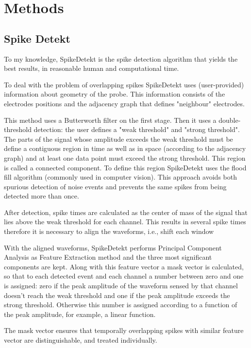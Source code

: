 
\section{Methods}
\label{sec:methods}
\subsection{Spike Detekt}
\label{subsec:spikedetekt}

To my knowledge, SpikeDetekt \cite{Rossant2016} is the spike detection algorithm that yields the best results, in reasonable human and computational time. 

To deal with the problem of overlapping spikes SpikeDetekt uses (user-provided) information about geometry of the probe. This information consists of the electrodes positions and the adjacency graph that defines "neighbour" electrodes. 

This method uses a Butterworth filter on the first stage. Then it uses a double-threshold detection: the user defines a "weak threshold" and "strong threshold". The parts of the signal whose amplitude exceeds the weak threshold must be define a contiguous region in time as well as in space (according to the adjacency graph) and at least one data point must exceed the strong threshold. This region is called a connected component. To define this region SpikeDetekt uses the flood fill algorithm (commonly used in computer vision). This approach avoids both spurious detection of noise events and prevents the same spikes from being detected more than once.
 
After detection, spike times are calculated as the center of mass of the signal that lies above the weak threshold for each channel. This results in several spike times therefore it is necessary to align the waveforms, i.e., shift each window 

With the aligned waveforms, SpikeDetekt performs Principal Component Analysis as Feature Extraction method and the three most significant components are kept. Along with this feature vector a mask vector is calculated, so that to each detected event and each channel a number between zero and one is assigned: zero if the peak amplitude of the waveform sensed by that channel doesn't reach the weak threshold and one if the peak amplitude exceeds the strong threshold. Otherwise this number is assigned according to a function of the peak amplitude, for example, a linear function.

The mask vector ensures that temporally overlapping spikes with similar feature vector are distinguishable, and treated individually.

